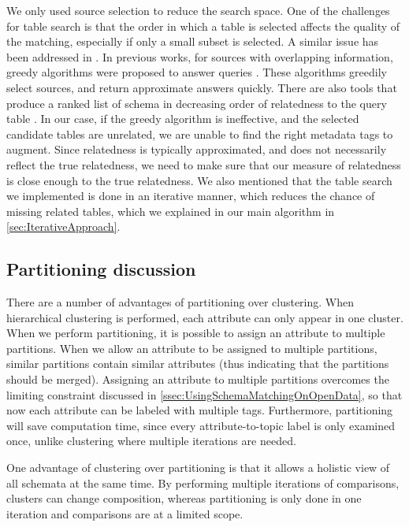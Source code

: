 We only used source selection to reduce the search space. One of the challenges for table search is that the order in which a table is selected affects the quality of the matching, especially if only a small subset is selected. A similar issue has been addressed in \cite{Dong2012Proceedings}. In previous works, for sources with overlapping information, greedy algorithms were proposed to answer queries \cite{10.1145/1951365.1951414}. These algorithms greedily select sources, and return approximate answers quickly. There are also tools that produce a ranked list of schema in decreasing order of relatedness to the query table \cite{DBLP:conf/sigmod/ChenMH09}. In our case, if the greedy algorithm is ineffective, and the selected candidate tables are unrelated, we are unable to find the right metadata tags to augment. Since relatedness is typically approximated, and does not necessarily reflect the true relatedness, we need to make sure that our measure of relatedness is close enough to the true relatedness. We also mentioned that the table search we implemented is done in an iterative manner, which reduces the chance of missing related tables, which we explained in our main algorithm in \autoref{sec:IterativeApproach}.

\subsection{Partitioning discussion}
\label{ssec:PartitioningDiscussion}

There are a number of advantages of partitioning over clustering. When hierarchical clustering is performed, each attribute can only appear in one cluster. When we perform partitioning, it is possible to assign an attribute to multiple partitions. When we allow an attribute to be assigned to multiple partitions, similar partitions contain similar attributes (thus indicating that the partitions should be merged). Assigning an attribute to multiple partitions overcomes the limiting constraint discussed in \autoref{ssec:UsingSchemaMatchingOnOpenData}, so that now each attribute can be labeled with multiple tags. Furthermore, partitioning will save computation time, since every attribute-to-topic label is only examined once, unlike clustering where multiple iterations are needed.

One advantage of clustering over partitioning is that it allows a holistic view of all schemata at the same time. By performing multiple iterations of comparisons, clusters can change composition, whereas partitioning is only done in one iteration and comparisons are at a limited scope.

